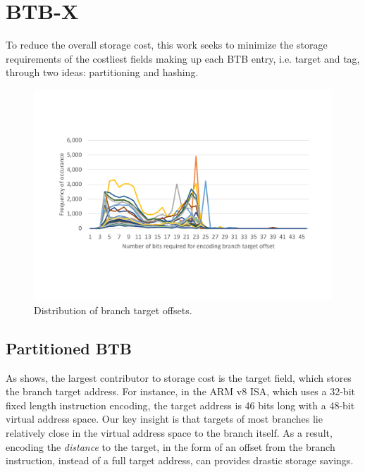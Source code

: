 \section{BTB-X}
\label{sec:design}


To reduce the overall storage cost, this work seeks to minimize the storage requirements of the costliest fields making up each BTB entry, i.e. target and tag, through two ideas: partitioning and hashing.  

\begin{figure}[t!]
    \centering
    \includegraphics[width=\columnwidth, trim=60 140 60 155, clip]{figures/OffsetLen1.pdf}
    \caption{Distribution of branch target offsets.}
    \vspace{-0.1in}
    \label{fig:offsets}
\end{figure}

\subsection{Partitioned BTB}

As  shows, the largest contributor to storage cost is the target field, which stores the branch target address. For instance, in the ARM v8 ISA, which uses a 32-bit fixed length instruction encoding, the target address is 46 bits long with a 48-bit virtual address space. Our key insight is that targets of most branches lie relatively close in the virtual address space to the branch itself. As a result, encoding the {\em distance} to the target, in the form of an offset from the branch instruction, instead of a full target address, can provides drastic storage savings. 

